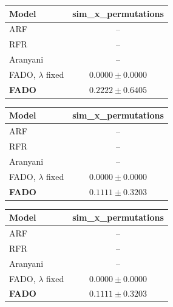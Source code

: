 \begin{tabular}{lc}
\toprule
\textbf{Model} & sim\_x\_permutations \\
\midrule
ARF & -- \\
RFR & -- \\
Aranyani & -- \\
FADO, $\lambda$ fixed & $0.0000 \pm 0.0000$ \\
\textbf{FADO} & $0.2222 \pm 0.6405$ \\
\bottomrule
\end{tabular}

\begin{tabular}{lc}
\toprule
\textbf{Model} & sim\_x\_permutations \\
\midrule
ARF & -- \\
RFR & -- \\
Aranyani & -- \\
FADO, $\lambda$ fixed & $0.0000 \pm 0.0000$ \\
\textbf{FADO} & $0.1111 \pm 0.3203$ \\
\bottomrule
\end{tabular}

\begin{tabular}{lc}
\toprule
\textbf{Model} & sim\_x\_permutations \\
\midrule
ARF & -- \\
RFR & -- \\
Aranyani & -- \\
FADO, $\lambda$ fixed & $0.0000 \pm 0.0000$ \\
\textbf{FADO} & $0.1111 \pm 0.3203$ \\
\bottomrule
\end{tabular}
